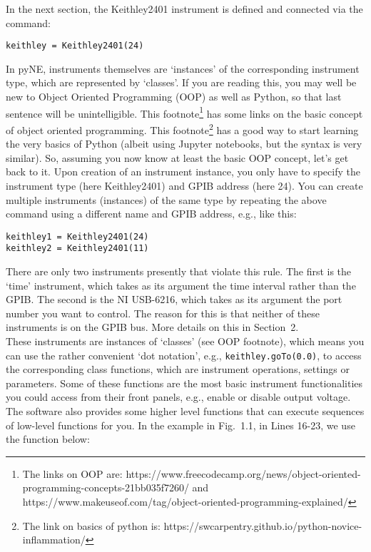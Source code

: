 In the next section, the Keithley2401 instrument is defined and connected via the command:\\

\begin{verbatim}
keithley = Keithley2401(24)
\end{verbatim}

In pyNE, instruments themselves are `instances' of the corresponding instrument type, which are represented by `classes'. If you are reading this, you may well be new to Object Oriented Programming (OOP) as well as Python, so that last sentence will be unintelligible. This footnote\footnote{The links on OOP are: https://www.freecodecamp.org/news/object-oriented-programming-concepts-21bb035f7260/ and https://www.makeuseof.com/tag/object-oriented-programming-explained/} has some links on the basic concept of object oriented programming. This footnote\footnote{The link on basics of python is: https://swcarpentry.github.io/python-novice-inflammation/} has a good way to start learning the very basics of Python (albeit using Jupyter notebooks, but the syntax is very similar). So, assuming you now know at least the basic OOP concept, let's get back to it. Upon creation of an instrument instance, you only have to specify the instrument type (here Keithley2401) and GPIB address (here 24). You can create multiple instruments (instances) of the same type by repeating the above command using a different name and GPIB address, e.g., like this:\\

\begin{verbatim}
keithley1 = Keithley2401(24)
keithley2 = Keithley2401(11)
\end{verbatim}

There are only two instruments presently that violate this rule. The first is the `time' instrument, which takes as its argument the time interval rather than the GPIB. The second is the NI USB-6216, which takes as its argument the port number you want to control. The reason for this is that neither of these instruments is on the GPIB bus. More details on this in Section~2.\\

These instruments are instances of `classes' (see OOP footnote), which means you can use the rather convenient `dot notation', e.g., \texttt{keithley.goTo(0.0)}, to access the corresponding class functions, which are instrument operations, settings or parameters. Some of these functions are the most basic instrument functionalities you could access from their front panels, e.g., enable or disable output voltage. The software also provides some higher level functions that can execute sequences of low-level functions for you. In the example in Fig.~1.1, in Lines 16-23, we use the function below:\\

